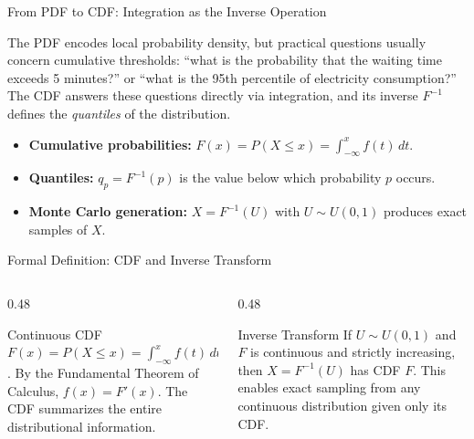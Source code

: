 \documentclass[aspectratio=169,xcolor={dvipsnames,table}]{beamer}
\begin{document}
\begin{frame}{From PDF to CDF: Integration as the Inverse Operation}
	\footnotesize
	\begin{motivacion}
		The PDF encodes local probability density, but practical questions usually concern cumulative thresholds: ``what is the probability that the waiting time exceeds 5 minutes?'' or ``what is the 95th percentile of electricity consumption?'' The CDF answers these questions directly via integration, and its inverse $F^{-1}$ defines the \emph{quantiles} of the distribution.
	\end{motivacion}
	\vspace{0.15cm}
	\pause
	\begin{itemize}\itemsep=0.1cm
		\item \textbf{Cumulative probabilities:} $F(x) = P(X \le x) = \int_{-\infty}^{x} f(t)\,dt$. \pause
		\item \textbf{Quantiles:} $q_{p} = F^{-1}(p)$ is the value below which probability $p$ occurs. \pause
		\item \textbf{Monte Carlo generation:} $X = F^{-1}(U)$ with $U \sim U(0, 1)$ produces exact samples of $X$.
	\end{itemize}
\end{frame}

\begin{frame}{Formal Definition: CDF and Inverse Transform}
	\vspace{-0.15cm}
	\begin{columns}[T]
		\begin{column}{0.48\textwidth}
			\begin{block}{Continuous CDF}
				\footnotesize
				$F(x) = P(X \le x) = \int_{-\infty}^{x} f(t)\,dt$. By the Fundamental Theorem of Calculus, $f(x) = F'(x)$. The CDF summarizes the entire distributional information.
			\end{block}
		\end{column}
		\begin{column}{0.48\textwidth}
			\begin{alertblock}{Inverse Transform}
				\footnotesize
				If $U \sim U(0, 1)$ and $F$ is continuous and strictly increasing, then $X = F^{-1}(U)$ has CDF $F$. This enables exact sampling from any continuous distribution given only its CDF.
			\end{alertblock}
		\end{column}
	\end{columns}
\end{frame}
\end{document}
